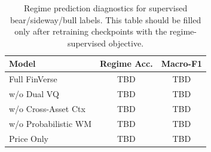 \begin{table}[t]
\centering
\caption{Regime prediction diagnostics for supervised bear/sideway/bull labels. This table should be filled only after retraining checkpoints with the regime-supervised objective.}
\label{tab:regime_prediction}
\begin{tabular}{lcc}
\toprule
Model & Regime Acc. & Macro-F1 \\
\midrule
Full FinVerse & TBD & TBD \\
w/o Dual VQ & TBD & TBD \\
w/o Cross-Asset Ctx & TBD & TBD \\
w/o Probabilistic WM & TBD & TBD \\
Price Only & TBD & TBD \\
\bottomrule
\end{tabular}
\end{table}
